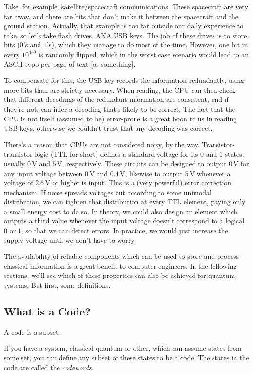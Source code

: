 \documentclass[10pt,a4paper, english]{scrartcl}
\providecommand{\volts}{\, \textrm{V}}
\begin{document}
Take, for example, satellite/spacecraft communications. 
These spacecraft are very far away, and there are bits that don't make it between the spacecraft and the ground station. 
Actually, that example is too far outside our daily experience to take, so let's take flash drives, AKA USB keys.
The job of these drives is to store bits ($0$'s and $1$'s), which they manage to do most of the time.
However, one bit in every $10^{4\text{--}9}$ is randomly flipped, which in the worst case scenario would lead to an ASCII typo per page of text [or something].

To compensate for this, the USB key records the information redundantly, using more bits than are strictly necessary.
When reading, the CPU can then check that different decodings of the redundant information are consistent, and if they're not, can infer a decoding that's likely to be correct. 
The fact that the CPU is not itself (assumed to be) error-prone is a great boon to us in reading USB keys, otherwise we couldn't trust that any decoding was correct. 

There's a reason that CPUs are not considered noisy, by the way.
Transistor-transistor logic (TTL for short) defines a standard voltage for its $0$ and $1$ states, usually $0 \volts$ and  $5 \volts$, respectively.
These circuits can be designed to output $0 \volts$ for any input voltage between $0 \volts$ and $0.4 \volts$, likewise to output $5 \volts$ whenever a voltage of $2.6 \volts$ or higher is input. 
This is a (very powerful) error correction mechanism. 
If noise spreads voltages out according to some unimodal distribution, we can tighten that distribution at every TTL element, paying only a small energy cost to do so. 
In theory, we could also design an element which outputs a third value whenever the input voltage doesn't correspond to a logical $0$ or $1$, so that we can detect errors. 
In practice, we would just increase the supply voltage until we don't have to worry. 

The availability of reliable components which can be used to store and process classical information is a great benefit to computer engineers.
In the following sections, we'll see which of these properties can also be achieved for quantum systems. 
But first, some definitions.
\subsection{What is a Code?}
A code is a subset. 

If you have a system, classical quantum or other, which can assume states from some set, you can define any subset of these states to be a code.
The states in the code are called the \emph{codewords}.
\end{document}
